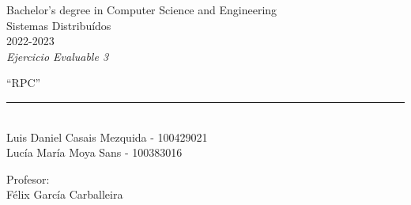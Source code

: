 \begin{titlepage}
    \begin{sffamily}
    \color{azulUC3M}
    \begin{center}
        \begin{figure}[H]
        \end{figure}
        \vspace{1.5cm}
        \begin{Large}
            Bachelor's degree in Computer Science and Engineering\\
            Sistemas Distribuídos\\
            2022-2023\\
            \vspace{2cm}
            \textsl{Ejercicio Evaluable 3}
            \bigskip

        \end{Large}
            {\Huge ``RPC''}\\
            \vspace*{0.5cm}
            \rule{10.5cm}{0.1mm}\\
            \vspace*{0.9cm}
            {\LARGE Luis Daniel Casais Mezquida - 100429021}\\
            \vspace*{0.2cm}
            {\LARGE Lucía María Moya Sans - 100383016}\\
            \vspace*{0.2cm}

            \vspace*{0.8cm}
        \begin{Large}
            Profesor:\\
            Félix García Carballeira\\
        \end{Large}
    \end{center}
    \vfill

    \end{sffamily}
\end{titlepage}
